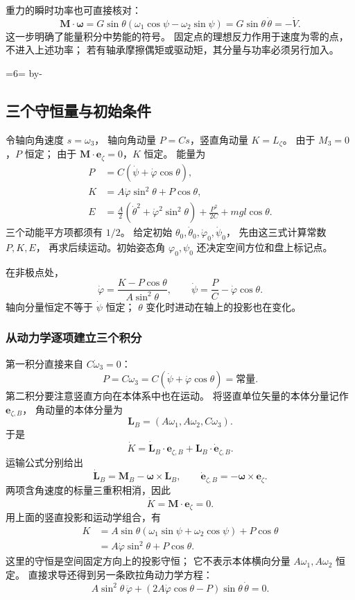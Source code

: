 \documentclass[UTF8,zihao=-4,fontset=fandol,a4paper]{ctexart}
\makeatletter
\newcommand{\vect}[1]{\bm{#1}}
\newcommand{\Needspace}[1]{\par\if@nobreak\else\penalty0\begingroup\dimen0=#1\relax\dimen2=\pagegoal\advance\dimen2 by-\pagetotal\ifdim\dimen0>\dimen2\newpage\fi\endgroup\fi}
\let\SavedSubsection\subsection
\renewcommand{\subsection}{\Needspace{6\baselineskip}\SavedSubsection}
\makeatother
\begin{document}
重力的瞬时功率也可直接核对：
\[
\vect M\cdot\vect\omega
=G\sin\theta(\omega_1\cos\psi-\omega_2\sin\psi)
=G\sin\theta\,\dot\theta=-\dot V.
\]
这一步明确了能量积分中势能的符号。
固定点的理想反力作用于速度为零的点，不进入上述功率；
若有轴承摩擦偶矩或驱动矩，其分量与功率必须另行加入。


\subsection{三个守恒量与初始条件}\label{sub:c3-9.2}
令轴向角速度 $s=\omega_3$，
轴向角动量 $P=Cs$，竖直角动量 $K=L_\zeta$。
由于 $M_3=0$，$P$ 恒定；
由于 $\vect M\cdot\vect e_\zeta=0$，$K$ 恒定。
能量为
\begin{equation}\label{eq:heavyintegrals}
\begin{aligned}
P&=C(\dot\psi+\dot\varphi\cos\theta),\\
K&=A\dot\varphi\sin^2\theta+P\cos\theta,\\
E&=\frac A2(\dot\theta^2+\dot\varphi^2\sin^2\theta)
+\frac{P^2}{2C}+mgl\cos\theta.
\end{aligned}
\end{equation}
三个动能平方项都须有 $1/2$。
给定初始 $\theta_0,\dot\theta_0,\dot\varphi_0,\dot\psi_0$，
先由这三式计算常数 $P,K,E$，
再求后续运动。初始姿态角 $\varphi_0,\psi_0$ 还决定空间方位和盘上标记点。

在非极点处，
\[
\dot\varphi=\frac{K-P\cos\theta}{A\sin^2\theta},\qquad
\dot\psi=\frac PC-\dot\varphi\cos\theta.
\]
轴向分量恒定不等于 $\dot\psi$ 恒定；
$\theta$ 变化时进动在轴上的投影也在变化。


\subsubsection*{从动力学逐项建立三个积分}
第一积分直接来自 $C\dot\omega_3=0$：
\[
P=C\omega_3=C(\dot\psi+\dot\varphi\cos\theta)=\text{常量}.
\]
第二积分要注意竖直方向在本体系中也在运动。
将竖直单位矢量的本体分量记作 $\vect e_{\zeta,B}$，
角动量的本体分量为
\[
\vect L_B=(A\omega_1,A\omega_2,C\omega_3).
\]
于是
\[
\dot K=\dot{\vect L}_B\cdot\vect e_{\zeta,B}
+\vect L_B\cdot\dot{\vect e}_{\zeta,B}.
\]
运输公式分别给出
\[
\dot{\vect L}_B=\vect M_B-\vect\omega\times\vect L_B,
\qquad
\dot{\vect e}_{\zeta,B}=-\vect\omega\times\vect e_\zeta.
\]
两项含角速度的标量三重积相消，因此
\[
\dot K=\vect M\cdot\vect e_\zeta=0.
\]
用上面的竖直投影和运动学组合，有
\[
\begin{aligned}
K&=A\sin\theta(\omega_1\sin\psi+\omega_2\cos\psi)
+P\cos\theta\\
&=A\dot\varphi\sin^2\theta+P\cos\theta.
\end{aligned}
\]
这里的守恒是空间固定方向上的投影守恒；
它不表示本体横向分量 $A\omega_1,A\omega_2$ 恒定。
直接求导还得到另一条欧拉角动力学方程：
\[
A\sin^2\theta\,\ddot\varphi
+(2A\dot\varphi\cos\theta-P)\sin\theta\,\dot\theta=0.
\]
\end{document}
